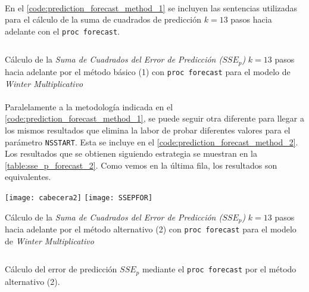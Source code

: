 \documentclass[a4paper, spanish]{article}
\begin{document}
    \paragraph{}
    En el \autoref{code:prediction_forecast_method_1} se incluyen las sentencias utilizadas para el cálculo de la suma de cuadrados de predicción $k = 13$ pasos hacia adelante con el \texttt{proc forecast}.

    \begin{listing}[htb!]
      \centering
      \inputminted{SAS}{./res/code/e-prediction-forecast-method-1.sas}
      \caption{Cálculo de la \emph{Suma de Cuadrados del Error de Predicción ($SSE_p$)} $k = 13$ pasos hacia adelante por el método básico (1) con \texttt{proc forecast} para el modelo de \emph{Winter Multiplicativo}}
      \label{code:prediction_forecast_method_1}
    \end{listing}

    \paragraph{}
    Paralelamente a la metodología indicada en el \autoref{code:prediction_forecast_method_1}, se puede seguir otra diferente para llegar a los mismos resultados que elimina la labor de probar diferentes valores para el parámetro \texttt{NSSTART}. Esta se incluye en el \autoref{code:prediction_forecast_method_2}. Los resultados que se obtienen siguiendo estrategia se muestran en la \autoref{table:sse_p_forecast_2}. Como vemos en la última fila, los resultados son equivalentes.

    \begin{table}[htb!]
      \centering
      \texttt{[image: cabecera2]}
      \texttt{[image: SSEPFOR]}
      \caption{Cálculo de la \emph{Suma de Cuadrados del Error de Predicción ($SSE_p$)} $k = 13$ pasos hacia adelante por el método alternativo (2) con \texttt{proc forecast} para el modelo de \emph{Winter Multiplicativo}}
      \label{table:sse_p_forecast_2}
    \end{table}

    \begin{listing}[htb!]
      \centering
      \inputminted{SAS}{./res/code/e-prediction-forecast-method-2.sas}
      \caption{Cálculo del error de predicción $SSE_p$ mediante el \texttt{proc forecast} por el método alternativo (2).}
      \label{code:prediction_forecast_method_2}
    \end{listing}
\end{document}
